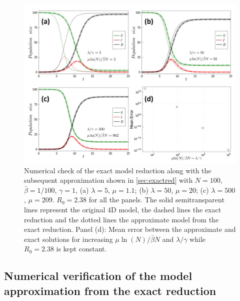 \begin{figure}[H]
    \centering
    \includegraphics[width=1\textwidth]{Figures/exact_reduction_approx.jpg}
    \caption{Numerical check of the exact model reduction along with the
        subsequent approximation shown in \cref{sec:exactred} with $N=100$,
        $\bar{\beta}=1/100$, $\gamma=1$, (a) $\lambda=5$, $\mu=1.1$; (b)
        $\lambda=50$,
        $\mu=20$; (c) $\lambda=500$, $\mu=209$. $R_0=2.38$ for all the panels.
        The
        solid semitransparent lines represent the original 4D model, the dashed
        lines
        the exact reduction and the dotted lines the approximate model from the
        exact
        reduction. Panel (d): Mean error between the approximate and exact
        solutions
        for increasing $\mu\ln(N)/\bar{\beta}N$ and $\lambda/\gamma$ while
        $R_0=2.38$
        is kept constant.}
    \label{fig:verification_exact_reduction}
\end{figure}

\subsection{Numerical verification of the model approximation from the
    exact reduction} \label{sec:apprexred}

